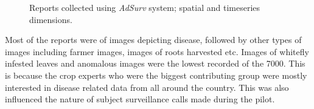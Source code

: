 \documentclass[letterpaper]{article} %
\begin{document}
\begin{figure}[!h]
  \centering
    \caption{Reports collected using \emph{AdSurv} system; spatial and timeseries dimensions.}
    \label{reports}
\end{figure}







Most of the reports were of images depicting disease, followed by other types of images including farmer images, images of roots harvested etc. Images of whitefly infested leaves and anomalous images were the lowest recorded of the 7000. This is because the crop experts who were the biggest contributing group were mostly interested in disease related data from all around the country. This was also influenced the nature of subject surveillance calls made during the pilot.
\end{document}
